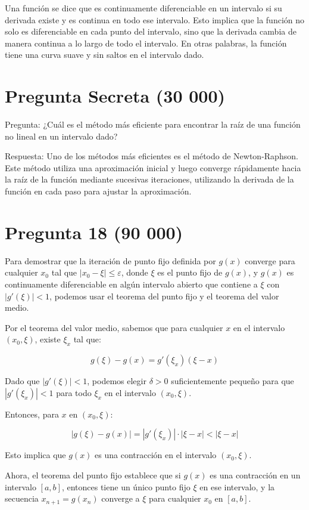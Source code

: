 \documentclass[a4paper,12pt]{article}
\begin{document}
Una función se dice que es continuamente diferenciable en un intervalo si su derivada existe y es continua en todo ese intervalo. Esto implica que la función no solo es diferenciable en cada punto del intervalo, sino que la derivada cambia de manera continua a lo largo de todo el intervalo. En otras palabras, la función tiene una curva suave y sin saltos en el intervalo dado.


\section*{Pregunta Secreta (30 000)}
Pregunta: ¿Cuál es el método más eficiente para encontrar la raíz de una función no lineal en un intervalo dado? 

Respuesta: Uno de los métodos más eficientes es el método de Newton-Raphson. Este método utiliza una aproximación inicial y luego converge rápidamente hacia la raíz de la función mediante sucesivas iteraciones, utilizando la derivada de la función en cada paso para ajustar la aproximación.


\section*{Pregunta 18 (90 000)}
Para demostrar que la iteración de punto fijo definida por \( g(x) \) converge para cualquier \( x_0 \) tal que \( |x_0 - \xi| \leq \varepsilon \), donde \( \xi \) es el punto fijo de \( g(x) \), y \( g(x) \) es continuamente diferenciable en algún intervalo abierto que contiene a \( \xi \) con \( |g'(\xi)| < 1 \), podemos usar el teorema del punto fijo y el teorema del valor medio.

Por el teorema del valor medio, sabemos que para cualquier \( x \) en el intervalo \( (x_0, \xi) \), existe \( \xi_x \) tal que:

\[ g(\xi) - g(x) = g'(\xi_x)(\xi - x) \]

Dado que \( |g'(\xi)| < 1 \), podemos elegir \( \delta > 0 \) suficientemente pequeño para que \( |g'(\xi_x)| < 1 \) para todo \( \xi_x \) en el intervalo \( (x_0, \xi) \).

Entonces, para \( x \) en \( (x_0, \xi) \):

\[ |g(\xi) - g(x)| = |g'(\xi_x)| \cdot |\xi - x| < |\xi - x| \]

Esto implica que \( g(x) \) es una contracción en el intervalo \( (x_0, \xi) \).

Ahora, el teorema del punto fijo establece que si \( g(x) \) es una contracción en un intervalo \( [a, b] \), entonces tiene un único punto fijo \( \xi \) en ese intervalo, y la secuencia \( x_{n+1} = g(x_n) \) converge a \( \xi \) para cualquier \( x_0 \) en \( [a, b] \).
\end{document}
